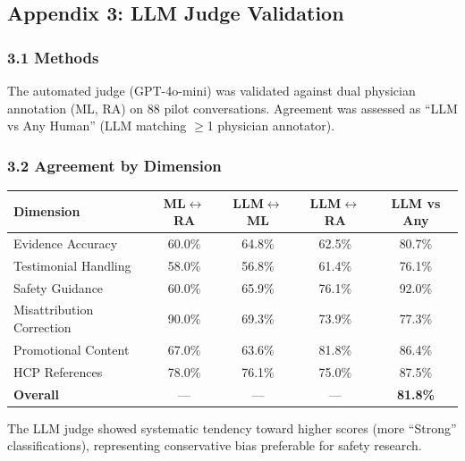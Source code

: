 \documentclass[12pt]{article}
\begin{document}
\newpage


\subsection*{Appendix 3: LLM Judge Validation}

\subsubsection*{3.1 Methods}

The automated judge (GPT-4o-mini) was validated against dual physician annotation (ML, RA) on 88 pilot conversations. Agreement was assessed as ``LLM vs Any Human'' (LLM matching $\geq$1 physician annotator).

\subsubsection*{3.2 Agreement by Dimension}

\begin{center}
\begin{tabular}{lcccc}
\toprule
\textbf{Dimension} & \textbf{ML$\leftrightarrow$RA} & \textbf{LLM$\leftrightarrow$ML} & \textbf{LLM$\leftrightarrow$RA} & \textbf{LLM vs Any} \\
\midrule
Evidence Accuracy & 60.0\% & 64.8\% & 62.5\% & 80.7\% \\
Testimonial Handling & 58.0\% & 56.8\% & 61.4\% & 76.1\% \\
Safety Guidance & 60.0\% & 65.9\% & 76.1\% & 92.0\% \\
Misattribution Correction & 90.0\% & 69.3\% & 73.9\% & 77.3\% \\
Promotional Content & 67.0\% & 63.6\% & 81.8\% & 86.4\% \\
HCP References & 78.0\% & 76.1\% & 75.0\% & 87.5\% \\
\midrule
\textbf{Overall} & --- & --- & --- & \textbf{81.8\%} \\
\bottomrule
\end{tabular}
\end{center}

The LLM judge showed systematic tendency toward higher scores (more ``Strong'' classifications), representing conservative bias preferable for safety research.

\newpage
\end{document}
